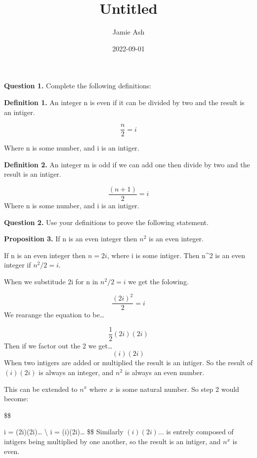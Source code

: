 \documentclass[
]{article}
\title{Untitled}
\author{Jamie Ash}
\date{2022-09-01}
\begin{document}
\maketitle

\textbf{Question 1.} Complete the following definitions:

\textbf{Definition 1.} An integer n is even if it can be divided by two
and the result is an intiger.

\[
\frac{n}{2} = i
\]

Where n is some number, and i is an intiger.

\textbf{Definition 2.} An integer m is odd if we can add one then divide
by two and the result is an intiger.

\[
\frac{(n+1)}{2} = i
\] Where n is some number, and i is an intiger.

\textbf{Question 2.} Use your definitions to prove the following
statement.

\textbf{Proposition 3.} If n is an even integer then \(n^2\) is an even
integer.

If n is an even integer then \(n = 2i\), where i is some intiger. Then
n\^{}2 is an even integer if \(n^2/2 = i\).

When we substitude 2i for n in \(n^2/2 = i\) we get the folowing.

\[
\frac{(2i)^2}{2} = i \tag{1}
\] We rearange the equation to be\ldots{}

\[
\frac{1}{2}(2i)(2i) \tag{2}
\] Then if we factor out the 2 we get\ldots{} \[
(i)(2i) \tag{3}
\] When two intigers are added or multiplied the result is an intiger.
So the result of \((i)(2i)\) is always an integer, and \(n^2\) is always
an even number.

This can be extended to \(n^x\) where \(x\) is some natural number. So
step 2 would become:

\$\$

i = (2i)(2i)\ldots{} \textbackslash{} i = (i)(2i)\ldots{}
\$\$ Similarly \((i)(2i)...\) is entrely composed of intigers being
multiplied by one another, so the result is an intiger, and \(n^x\) is
even.
\end{document}
